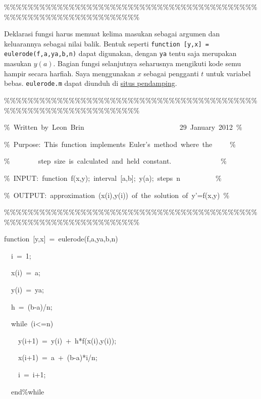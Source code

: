 \begin{description}
\begin{lyxcode}
\%\%\%\%\%\%\%\%\%\%\%\%\%\%\%\%\%\%\%\%\%\%\%\%\%\%\%\%\%\%\%\%\%\%\%\%\%\%\%\%\%\%\%\%\%\%\%\%\%\%\%\%\%\%\%\%\%\%\%\%\%\%\%\%\%\%
\end{lyxcode}
Deklarasi fungsi harus memuat kelima masukan sebagai argumen dan keluarannya
sebagai nilai balik. Bentuk seperti \texttt{function {[}y,x{]} = eulerode(f,a,ya,b,n)}
dapat digunakan, dengan \texttt{ya} tentu saja merupakan masukan $y(a)$.
Bagian fungsi selanjutnya seharusnya mengikuti kode semu hampir secara
harfiah. Saya menggunakan $x$ sebagai pengganti $t$ untuk variabel
bebas. \texttt{eulerode.m} dapat diunduh
di \href{http://lqbrin.github.io/tea-time-numerical/ancillaries.html}{situs pendamping}.\label{code:euler}
\begin{lyxcode}
\%\%\%\%\%\%\%\%\%\%\%\%\%\%\%\%\%\%\%\%\%\%\%\%\%\%\%\%\%\%\%\%\%\%\%\%\%\%\%\%\%\%\%\%\%\%\%\%\%\%\%\%\%\%\%\%\%\%\%\%\%\%\%\%\%\%

\%~Written~by~Leon~Brin~~~~~~~~~~~~~~~~~~~~~~~~~~~29~January~2012~\%

\%~Purpose:~This~function~implements~Euler's~method~where~the~~~~~\%

\%~~~~~~~~step~size~is~calculated~and~held~constant.~~~~~~~~~~~~~~\%

\%~INPUT:~function~f(x,y);~interval~{[}a,b{]};~y(a);~steps~n~~~~~~~~~~\%

\%~OUTPUT:~approximation~(x(i),y(i))~of~the~solution~of~y'=f(x,y)~\%

\%\%\%\%\%\%\%\%\%\%\%\%\%\%\%\%\%\%\%\%\%\%\%\%\%\%\%\%\%\%\%\%\%\%\%\%\%\%\%\%\%\%\%\%\%\%\%\%\%\%\%\%\%\%\%\%\%\%\%\%\%\%\%\%\%\%

function~{[}y,x{]}~=~eulerode(f,a,ya,b,n)

~~i~=~1;

~~x(i)~=~a;

~~y(i)~=~ya;

~~h~=~(b-a)/n;

~~while~(i<=n)

~~~~y(i+1)~=~y(i)~+~h{*}f(x(i),y(i));

~~~~x(i+1)~=~a~+~(b-a){*}i/n;

~~~~i~=~i+1;

~~end\%while


\end{lyxcode}
\end{description}
